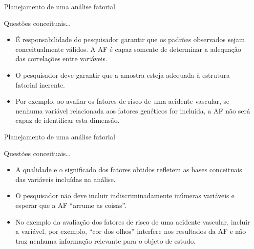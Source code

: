 \documentclass[
  ignorenonframetext,
  aspectratio=169,
]{beamer}
\providecommand{\tightlist}{%
  \setlength{\itemsep}{0pt}\setlength{\parskip}{0pt}}
\begin{document}
\begin{frame}{Planejamento de uma análise fatorial}
\label{planejamento-de-uma-anuxe1lise-fatorial-2}
\begin{block}{Questões conceituais\ldots{}}
\label{questuxf5es-conceituais}
\bigskip

\begin{itemize}
\tightlist
\item
  É responsabilidade do pesquisador garantir que os padrões observados
  sejam conceitualmente válidos. A AF é capaz somente de determinar a
  adequação das correlações entre variáveis.
\end{itemize}

\medskip

\begin{itemize}
\tightlist
\item
  O pesquisador deve garantir que a amostra esteja adequada à estrutura
  fatorial inerente.
\end{itemize}

\medskip

\begin{itemize}
\tightlist
\item
  Por exemplo, ao avaliar os fatores de risco de uma acidente vascular,
  se nenhuma variável relacionada aos fatores genéticos for incluída, a
  AF não será capaz de identificar esta dimensão.
\end{itemize}
\end{block}
\end{frame}

\begin{frame}{Planejamento de uma análise fatorial}
\label{planejamento-de-uma-anuxe1lise-fatorial-3}
\begin{block}{Questões conceituais\ldots{}}
\label{questuxf5es-conceituais-1}
\begin{itemize}
\tightlist
\item
  A qualidade e o significado dos fatores obtidos refletem as bases
  conceituais das variáveis incluídas na análise.
\end{itemize}

\medskip

\begin{itemize}
\tightlist
\item
  O pesquisador não deve incluir indiscriminadamente inúmeras variáveis
  e esperar que a AF ``arrume as coisas''.
\end{itemize}

\medskip

\begin{itemize}
\tightlist
\item
  No exemplo da avaliação dos fatores de risco de uma acidente vascular,
  incluir a variável, por exemplo, ``cor dos olhos'' interfere nos
  resultados da AF e não traz nenhuma informação relevante para o objeto
  de estudo.
\end{itemize}
\end{block}
\end{frame}
\end{document}
